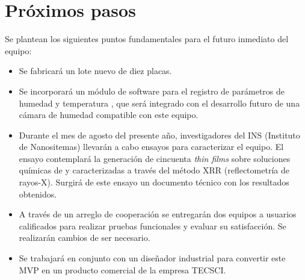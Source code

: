 \section{Próximos pasos}

Se plantean los siguientes puntos fundamentales para el futuro inmediato del equipo:  

\begin{itemize}

\item Se fabricará un lote nuevo de diez placas. 

\item Se incorporará un módulo de software para el registro de parámetros de humedad y temperatura , que será integrado con el desarrollo futuro de una cámara de humedad compatible con este equipo.

\item Durante el mes de agosto del presente año, investigadores del INS (Instituto de Nanositemas) llevarán a cabo ensayos para caracterizar el equipo. El ensayo contemplará la generación de cincuenta \textit{thin films} sobre soluciones químicas de  y  caracterizadas a través del método XRR (reflectometría de rayos-X). Surgirá de este ensayo un documento técnico con los resultados obtenidos.  
 
\item A través de un arreglo de cooperación se entregarán dos equipos a usuarios calificados para realizar pruebas funcionales y evaluar su satisfacción. Se realizarán cambios de ser necesario.


\item Se trabajará en conjunto con un diseñador industrial para convertir este MVP en un producto comercial de la empresa TECSCI.

\end{itemize}


